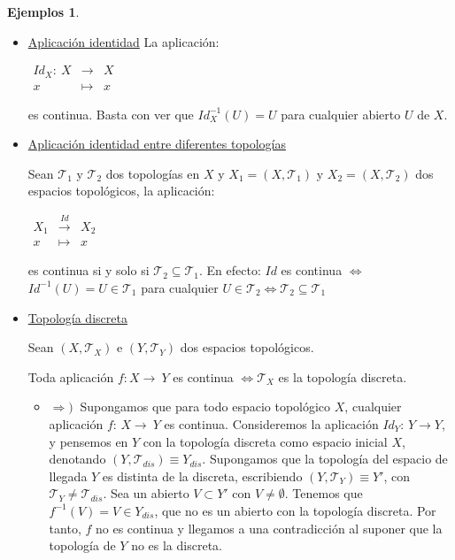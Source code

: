 \documentclass[12pt,twoside]{report}
\newcommand\mc[1]{\mathcal{#1}}
\theoremstyle{azul}
\theoremstyle{azul2}
\theoremstyle{plain}
\theoremstyle{definition}
\newtheorem*{ejes}{Ejemplos}
\theoremstyle{remark}
\begin{document}
\begin{ejes} \: \vspace{-5mm}
\begin{itemize}
    \item \underline{Aplicación identidad}
    La aplicación:
    
    \hspace{1cm} $\begin{array}{rcl}
      Id_X: \: X & {\longrightarrow} & X \\
     x & \longmapsto & x
\end{array}$

es continua. Basta con ver que $Id_X^{-1}(U)=U$ para cualquier abierto $U$ de $X$. 

    \item \underline{Aplicación identidad entre diferentes topologías}
    
    Sean $\mc{T}_1$ y $\mc{T}_2$ dos topologías en $X$ y $X_1=(X,\mc{T}_1)$ y $X_2=(X,\mc{T}_2)$ dos espacios topológicos, la aplicación:
    
    \hspace{1cm}$\begin{array}{rcl}
     X_1 & \stackrel{Id}{\longrightarrow} & X_2  \\
     x & \longmapsto & x
\end{array}$
    
    es continua si y solo si $\mc{T}_2 \subseteq \mc{T}_1$. En efecto: $Id$ es continua $\Leftrightarrow$ $Id^{-1}(U)=U\in \mc{T}_1$  para cualquier $U\in \mc{T}_2\Leftrightarrow \mc{T}_2\subseteq\mc{T}_1$

    
    \item \underline{Topología discreta}
    
    Sean $(X,\mc{T}_X)$ e $(Y,\mc{T}_Y)$ dos espacios topológicos. 
    \begin{center}
    Toda aplicación $f:X {\longrightarrow} \: Y$ es continua $\Longleftrightarrow \mc{T}_X$ es la topología discreta. 
    \end{center}
    \begin{itemize}
        
\item $\Rightarrow)\:$ Supongamos que para todo espacio topológico $X$, cualquier aplicación $f:\,X {\longrightarrow} \: Y$ es continua. Consideremos la aplicación $Id_Y:\,Y\longrightarrow Y$, y pensemos en $Y$ con la topología discreta como espacio inicial $X$, denotando $(Y,\mc{T}_{dis}) \equiv Y_{dis}$. Supongamos que la topología del espacio de llegada $Y$ es distinta de la discreta, escribiendo $(Y,\mc{T}_Y) \equiv Y'$, con $\mc{T}_Y \neq \mc{T}_{dis}$. Sea un abierto $V \subset Y'$ con $V \neq \emptyset$. Tenemos que $f^{-1}(V) = V \in Y_{dis}$, que no es un abierto con la topología discreta. Por tanto, $f$ no es continua y llegamos a una contradicción al suponer que la topología de $Y$ no es la discreta.
    

\end{itemize}
\end{itemize}
\end{ejes}
\end{document}
